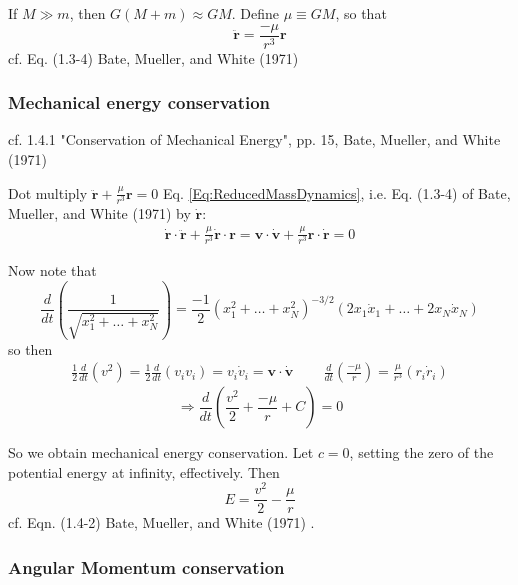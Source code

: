 \documentclass[10pt]{amsart}
\begin{document}
\begin{multicols*}{2}
If $M \gg m$, then $G(M + m) \approx GM$. Define $\mu \equiv GM$, so that 
\begin{equation}\label{Eq:ReducedMassDynamics}
	\ddot{\mathbf{r}} = \frac{-\mu}{r^3} \mathbf{r}
\end{equation}
cf. Eq. (1.3-4) Bate, Mueller, and White (1971) \cite{BMW1971}

\subsubsection{Mechanical energy conservation}

cf. 1.4.1 "Conservation of Mechanical Energy", pp. 15, Bate, Mueller, and White (1971) \cite{BMW1971}

Dot multiply $\ddot{\mathbf{r}} + \frac{\mu}{r^3} \mathbf{r} =0$ Eq. \ref{Eq:ReducedMassDynamics}, i.e. Eq. (1.3-4) of Bate, Mueller, and White (1971) \cite{BMW1971} by $\dot{\mathbf{r}}$:
\[
\begin{gathered}
	\dot{\mathbf{r}} \cdot \ddot{ \mathbf{r}} + \frac{ \mu}{r^3} \dot{\mathbf{r}} \cdot \mathbf{r} = \mathbf{v} \cdot \dot{\mathbf{v}} + \frac{\mu}{r^3} \mathbf{r} \cdot \dot{\mathbf{r}} = 0
\end{gathered}
\]

Now note that 
\[
\frac{d}{dt} \left( \frac{1}{\sqrt{ x_1^2 + \dots + x^2_N } } \right) = \frac{-1}{2} (x_1^2 + \dots + x_N^2 )^{-3/2} (2 x_1 \dot{x}_1 + \dots + 2 x_N \dot{x}_N )
\]
so then
\[
\begin{gathered}
	\frac{1}{2} \frac{d}{dt} (v^2) = \frac{1}{2} \frac{d}{dt} (v_i v_i) = v_i \dot{v}_i = \mathbf{v} \cdot \dot{\mathbf{v}} \quad \quad \, \frac{d}{dt} \left( \frac{-\mu}{r} \right) = \frac{ \mu}{r^3} (r_i \dot{r}_i)
\end{gathered}
\]
\[
\Longrightarrow \frac{d}{dt} \left( \frac{v^2}{2} + \frac{-\mu}{r} + C \right) = 0
\]

So we obtain mechanical energy conservation. Let $c=0$, setting the zero of the potential energy at infinity, effectively. Then
\begin{equation}
	E = \frac{v^2}{2} - \frac{\mu}{r}
\end{equation}
cf. Eqn. (1.4-2) Bate, Mueller, and White (1971) \cite{BMW1971}.

\subsubsection{Angular Momentum conservation}


\end{multicols*}
\end{document}
